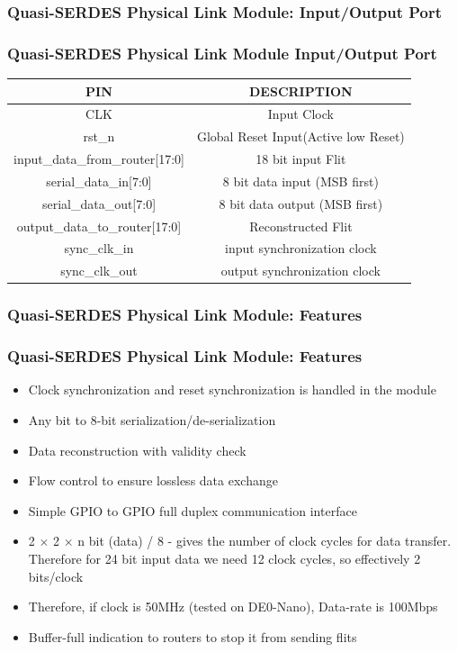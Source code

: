 \subsubsection{Quasi-SERDES Physical Link Module: Input/Output Port}
\begin{frame}
\frametitle{Quasi-SERDES Physical Link Module Input/Output Port}
\small
\begin{center}
\begin{tabular}{||c | c||} 
\hline
\textbf{PIN} & \textbf{DESCRIPTION} \\ \hline
CLK & Input Clock \\
rst\_n & Global Reset Input(Active low Reset)\\
input\_data\_from\_router[17:0] & 18 bit input Flit\\
serial\_data\_in[7:0] & 8 bit data input (MSB first)\\
serial\_data\_out[7:0] & 8 bit data output (MSB first)\\
output\_data\_to\_router[17:0] & Reconstructed Flit \\
sync\_clk\_in & input synchronization clock \\
sync\_clk\_out & output synchronization clock \\
\hline
\end{tabular}
\end{center}
\end{frame}

\subsubsection{Quasi-SERDES Physical Link Module: Features}
\begin{frame}
\frametitle{Quasi-SERDES Physical Link Module: Features}
\begin{itemize}
\item Clock synchronization and reset synchronization is handled in the module
\item Any bit to 8-bit serialization/de-serialization
\item Data reconstruction with validity check
\item Flow control to ensure lossless data exchange
\item Simple GPIO to GPIO full duplex communication interface
\item 2 $\times$ 2 $\times$ n bit (data) / 8 - gives the number of clock cycles for data transfer. Therefore for 24 bit input data we need 12 clock cycles, so effectively 2 bits/clock
\item Therefore, if clock is 50MHz (tested on DE0-Nano), Data-rate is 100Mbps
\item Buffer-full indication to routers to stop it from sending flits
\end{itemize}
\end{frame}


